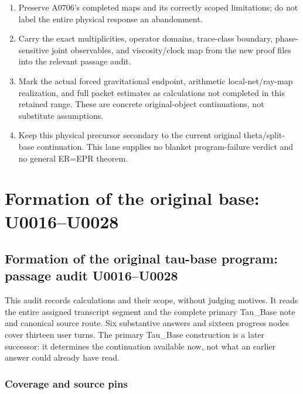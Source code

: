 \documentclass[10pt,a4paper,oneside]{report}
\providecommand{\tightlist}{\setlength{\itemsep}{0pt}\setlength{\parskip}{0pt}}
\begin{document}
\begin{enumerate}
\def\labelenumi{\arabic{enumi}.}
\tightlist
\item
  Preserve A0706's completed maps and its correctly scoped limitations;
  do not label the entire physical response an abandonment.
\item
  Carry the exact multiplicities, operator domains, trace-class
  boundary, phase-sensitive joint observables, and viscosity/clock map
  from the new proof files into the relevant passage audit.
\item
  Mark the actual forced gravitational endpoint, arithmetic
  local-net/ray-map realization, and full packet estimates as
  calculations not completed in this retained range. These are concrete
  original-object continuations, not substitute assumptions.
\item
  Keep this physical precursor secondary to the current original
  theta/split-base continuation. This lane supplies no blanket
  program-failure verdict and no general ER=EPR theorem.
\end{enumerate}

\clearpage

\chapter{Formation of the original base:
U0016--U0028}\label{formation-of-the-original-base-u0016u0028}

\section{Formation of the original tau-base program: passage audit
U0016--U0028}\label{formation-of-the-original-tau-base-program-passage-audit-u0016u0028}

This audit records calculations and their scope, without judging
motives. It reads the entire assigned transcript segment and the
complete primary Tau\_Base note and canonical source route. Six
substantive answers and sixteen progress nodes cover thirteen user
turns. The primary Tau\_Base construction is a later successor: it
determines the continuation available now, not what an earlier answer
could already have read.

\subsection{Coverage and source pins}\label{coverage-and-source-pins}
\end{document}
